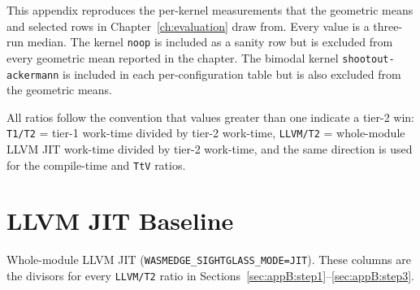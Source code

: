 
\label{ch:appendix-raw}

This appendix reproduces the per-kernel measurements that the geometric means and selected rows in Chapter~\ref{ch:evaluation} draw from. Every value is a three-run median. The kernel \texttt{noop} is included as a sanity row but is excluded from every geometric mean reported in the chapter. The bimodal kernel \texttt{shootout-ackermann} is included in each per-configuration table but is also excluded from the geometric means.

All ratios follow the convention that values greater than one indicate a tier-2 win: \texttt{T1/T2} = tier-1 work-time divided by tier-2 work-time, \texttt{LLVM/T2} = whole-module LLVM JIT work-time divided by tier-2 work-time, and the same direction is used for the compile-time and \texttt{TtV} ratios.

\section{LLVM JIT Baseline}
\label{sec:appB:llvm}

Whole-module LLVM JIT (\texttt{WASMEDGE\_SIGHTGLASS\_MODE=JIT}). These columns are the divisors for every \texttt{LLVM/T2} ratio in Sections~\ref{sec:appB:step1}--\ref{sec:appB:step3}.

